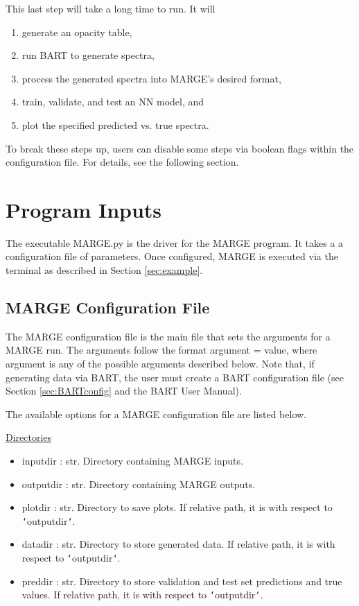\documentclass[letterpaper, 12pt]{article}
\begin{document}
\noindent This last step will take a long time to run.  It will 
\begin{enumerate}
\item generate an opacity table,
\item run BART to generate spectra,
\item process the generated spectra into MARGE's desired format,
\item train, validate, and test an NN model, and
\item plot the specified predicted vs. true spectra.
\end{enumerate}

\noindent To break these steps up, users can disable some steps via boolean 
flags within the configuration file.  For details, see the following section.


\section{Program Inputs}
\label{sec:inputs}

The executable MARGE.py is the driver for the MARGE program. It takes a 
a configuration file of parameters.  Once configured, MARGE is executed via 
the terminal as described in Section \ref{sec:example}.


\subsection{MARGE Configuration File}
\label{sec:config}
The MARGE configuration file is the main file that sets the arguments for a 
MARGE run. The arguments follow the format {\ttb argument = value}, where 
{\ttb argument} is any of the possible arguments described below. Note that, 
if generating data via BART, the user must create a BART configuration file 
(see Section \ref{sec:BARTconfig} and the BART User Manual).\newline

\noindent The available options for a MARGE configuration file are listed below.
\newline

\noindent \underline{Directories}
\begin{itemize}
\item inputdir   : str.  Directory containing MARGE inputs.
\item outputdir  : str.  Directory containing MARGE outputs.
\item plotdir    : str.  Directory to save plots. 
                         If relative path, it is with respect to 
                         \texttt{`}outputdir\texttt{`}.
\item datadir    : str.  Directory to store generated data. 
                         If relative path, it is with respect to 
                         \texttt{`}outputdir\texttt{`}.
\item preddir    : str.  Directory to store validation and test set predictions 
                         and true values. 
                         If relative path, it is with respect to 
                         \texttt{`}outputdir\texttt{`}.
\end{itemize}
\end{document}
